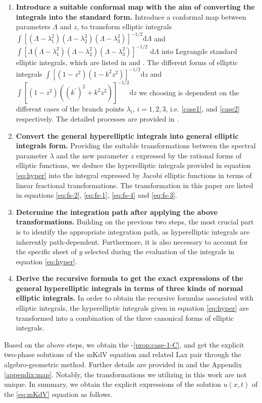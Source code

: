 \documentclass[11pt,reqno]{amsart}
\newcommand{\dd}{\mathrm{d}}
\numberwithin{equation}{section}
\begin{document}
\begin{enumerate}
	\item[\textbf{Step 1}] \textbf{Introduce a suitable conformal map with the aim of converting the integrals into the standard form.} 
	Introduce a conformal map between parameters $\Lambda$ and $z$, to transform elliptic integrals $\int [(\Lambda-\lambda_1^2)(\Lambda-\lambda_2^2)(\Lambda-\lambda_3^2)]^{-1/2} \dd \Lambda$ and $\int [\Lambda(\Lambda-\lambda_1^2)(\Lambda-\lambda_2^2)(\Lambda-\lambda_3^2)]^{-1/2}$ $\dd \Lambda$ into Legrangde standard elliptic integrals, which are listed in 
	 and .
	The different forms of elliptic integrals $\int [(1-z^2)(1-k^2z^2)]^{-1/2}\dd z$ and $\int [(1-z^2)((k^{\prime })^2+k^2z^2)]^{-1/2}\dd z$ we choosing is dependent on the different cases of the branch points $\lambda_i$, $i=1,2,3$, i.e.  \ref{case1},  and \ref{case2} respectively.
	The detailed processes are provided in .
	\item[\textbf{Step 2}] \textbf{Convert the general hyperelliptic integrals into general elliptic integrals form.}
	Providing the suitable transformations between the spectral parameter $\lambda$ and the new parameter $z$ expressed by the rational forms of elliptic functions, we deduce the hyperelliptic integrals provided in equation \eqref{eq:hyper} into the integral expressed by Jacobi elliptic functions in terms of linear fractional transformations.
	The transformation in this paper are listed in equations \eqref{eq:fs-2}, \eqref{eq:fs-1}, \eqref{eq:fs-4} and \eqref{eq:fs-3}.  
	\item[\textbf{Step 3}] \textbf{Determine the integration path after applying the above transformations.}
	Building on the previous two steps, the most crucial part is to identify the appropriate integration path, as hyperelliptic integrals are inherently path-dependent. Furthermore, it is also necessary to account for the specific sheet of $y$ selected during the evaluation of the integrals in equation \eqref{eq:hyper}.
	\item[\textbf{Step 4}] \textbf{Derive the recursive formula to get the exact expressions of the general hyperelliptic integrals in terms of three kinds of normal elliptic integrals.} 
	In order to obtain the recursive formulas associated with elliptic integrals, the hyperelliptic integrals given in equation \eqref{eq:hyper} are transformed into a combination of the three canonical forms of elliptic integrals. 
\end{enumerate}
Based on the above steps, we obtain the -\ref{prop:case-1-C},
and get the explicit two-phase solutions of the mKdV equation and related Lax pair through the algebro-geometric method. 
Further details are provided in  and the Appendix \ref{appendix:map}.
Notably, the transformations we utilizing in this work are not unique.
In summary, we obtain the explicit expressions of the solution $u(x,t)$ of the \ref{eq:mKdV} equation as follows.
\end{document}
